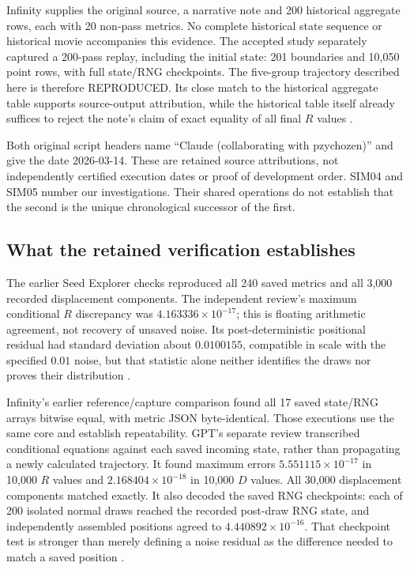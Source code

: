\documentclass[11pt,a4paper]{article}
\newcommand{\ev}[1]{\textsf{\small #1}}
\begin{document}
Infinity supplies the original source, a narrative note and 200 historical aggregate rows, each with 20 non-pass metrics. No complete historical state sequence or historical movie accompanies this evidence. The accepted study separately captured a 200-pass replay, including the initial state: 201 boundaries and 10,050 point rows, with full state/RNG checkpoints. The five-group trajectory described here is therefore \ev{REPRODUCED}. Its close match to the historical aggregate table supports source-output attribution, while the historical table itself already suffices to reject the note's claim of exact equality of all final $R$ values \cite{evidence5,review5}.

Both original script headers name ``Claude (collaborating with pzychozen)'' and give the date 2026-03-14. These are retained source attributions, not independently certified execution dates or proof of development order. SIM04 and SIM05 number our investigations. Their shared operations do not establish that the second is the unique chronological successor of the first.

\subsection{What the retained verification establishes}
The earlier Seed Explorer checks reproduced all 240 saved metrics and all 3,000 recorded displacement components. The independent review's maximum conditional $R$ discrepancy was $4.163336\times10^{-17}$; this is floating arithmetic agreement, not recovery of unsaved noise. Its post-deterministic positional residual had standard deviation about $0.0100155$, compatible in scale with the specified $0.01$ noise, but that statistic alone neither identifies the draws nor proves their distribution \cite{review4}.

Infinity's earlier reference/capture comparison found all 17 saved state/RNG arrays bitwise equal, with metric JSON byte-identical. Those executions use the same core and establish repeatability. GPT's separate review transcribed conditional equations against each saved incoming state, rather than propagating a newly calculated trajectory. It found maximum errors $5.551115\times10^{-17}$ in 10,000 $R$ values and $2.168404\times10^{-18}$ in 10,000 $D$ values. All 30,000 displacement components matched exactly. It also decoded the saved RNG checkpoints: each of 200 isolated normal draws reached the recorded post-draw RNG state, and independently assembled positions agreed to $4.440892\times10^{-16}$. That checkpoint test is stronger than merely defining a noise residual as the difference needed to match a saved position \cite{review5}.
\end{document}
